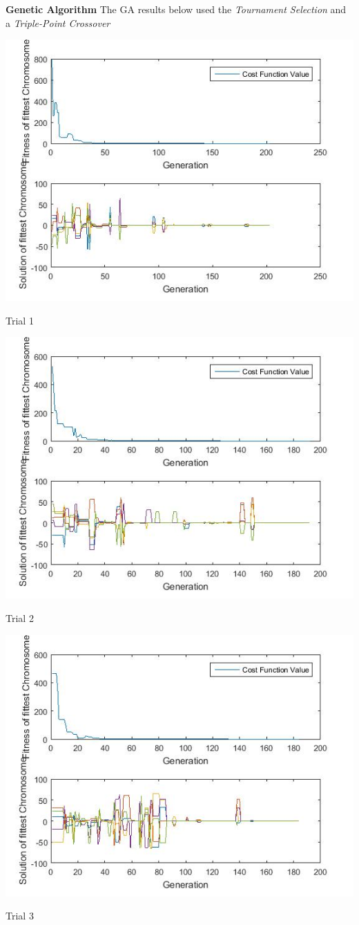\documentclass{article}
\begin{document}
\textbf{Genetic Algorithm} The GA results below used the \textit{Tournament Selection} and a \textit{Triple-Point Crossover}\\
\centerline{\includegraphics[width=0.5\linewidth]{ga_tf3_s1_c2a}}
\centerline{Trial 1}
\centerline{\includegraphics[width=0.5\linewidth]{ga_tf3_s1_c2b}}
\centerline{Trial 2}
\centerline{\includegraphics[width=0.5\linewidth]{ga_tf3_s1_c2c}}
\centerline{Trial 3}
\end{document}
